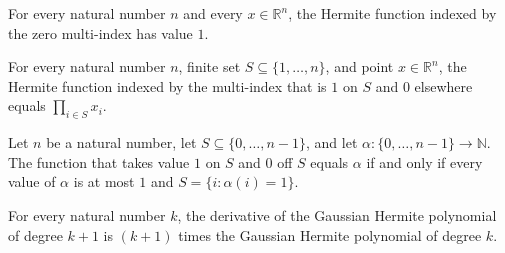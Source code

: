 \begin{theorem}
\label{BooleanAnalysis.GaussianSpace.hermiteFunction_zero}
\leanok
{}
For every natural number $n$ and every $x\in\mathbb R^n$, the Hermite function indexed
by the zero multi-index has value $1$.
\end{theorem}

\begin{theorem}
\label{BooleanAnalysis.GaussianSpace.hermiteFunction_indicator}
\leanok
{}
For every natural number $n$, finite set $S\subseteq\{1,\ldots,n\}$, and point
$x\in\mathbb R^n$, the Hermite function indexed by the multi-index that is $1$ on $S$
and $0$ elsewhere equals $\prod_{i\in S}x_i$.
\end{theorem}

\begin{lemma}
\label{BooleanAnalysis.GaussianSpace.indicatorMultiIndex_eq_iff}
\leanok
{}
Let $n$ be a natural number, let $S\subseteq\{0,\ldots,n-1\}$, and let
$\alpha\colon\{0,\ldots,n-1\}\to\mathbb N$. The function that takes value $1$ on $S$ and
$0$ off $S$ equals $\alpha$ if and only if every value of $\alpha$ is at most $1$ and
$S=\{i:\alpha(i)=1\}$.
\end{lemma}

\begin{lemma}
\label{BooleanAnalysis.GaussianSpace.derivative_hermite_succ}
\leanok
{}
For every natural number $k$, the derivative of the Gaussian Hermite polynomial of
degree $k+1$ is $(k+1)$ times the Gaussian Hermite polynomial of degree $k$.
\end{lemma}
